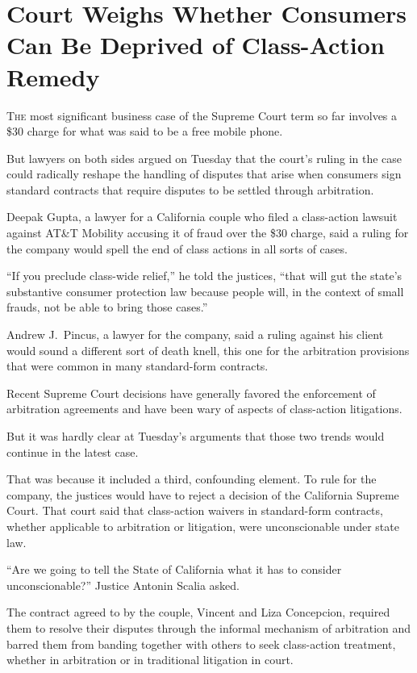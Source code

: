 ﻿\documentclass[12pt]{article}
\begin{document}
\section{Court Weighs Whether Consumers Can Be Deprived of Class-Action Remedy}

\lettrine{T}{he} most significant business case of the Supreme Court term so
far involves a \$30 charge for what was said to be a free mobile phone.

But lawyers on both sides argued on Tuesday that the court's ruling in the case could radically
reshape the handling of disputes that arise when consumers sign standard contracts that require
disputes to be settled through arbitration.

Deepak Gupta, a lawyer for a California couple who filed a class-action lawsuit against AT\&T
Mobility accusing it of fraud over the \$30 charge, said a ruling for the company would spell the
end of class actions in all sorts of cases.

``If you preclude class-wide relief,'' he told the justices, ``that will gut the state's substantive
consumer protection law because people will, in the context of small frauds, not be able to bring
those cases.''

Andrew J.~Pincus, a lawyer for the company, said a ruling against his client would sound a different
sort of death knell, this one for the arbitration provisions that were common in many standard-form
contracts.

Recent Supreme Court decisions have generally favored the enforcement of arbitration agreements and
have been wary of aspects of class-action litigations.

But it was hardly clear at Tuesday's arguments that those two trends would continue in the latest
case.

That was because it included a third, confounding element. To rule for the company, the justices
would have to reject a decision of the California Supreme Court. That court said that class-action
waivers in standard-form contracts, whether applicable to arbitration or litigation, were
unconscionable under state law.

``Are we going to tell the State of California what it has to consider unconscionable?'' Justice
Antonin Scalia asked.

The contract agreed to by the couple, Vincent and Liza Concepcion, required them to resolve their
disputes through the informal mechanism of arbitration and barred them from banding together with
others to seek class-action treatment, whether in arbitration or in traditional litigation in court.
\end{document}
